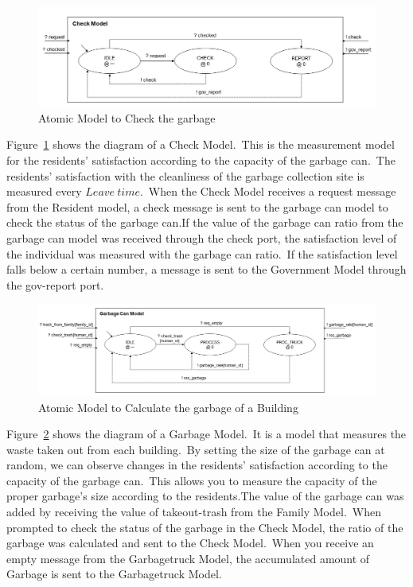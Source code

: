 \documentclass{scsSimAUDPaperFormat}
\begin{document}
\begin{figure}[!ht]
    \centering
    \includegraphics[width=1.0\columnwidth]{fig/check_model.jpg}
    \caption{Atomic Model to Check the garbage}
    \label{Fig:Checkmodel}
\end{figure}
Figure~\ref{Fig:Checkmodel} shows the diagram of a Check Model.~This is the measurement model for the residents' satisfaction according to the capacity of the garbage can.~The residents' satisfaction with the cleanliness of the garbage collection site is measured every $Leave\ time$.~When the Check Model receives a request message from the Resident model, a check message is sent to the garbage can model to check the status of the garbage can.If the value of the garbage can ratio from the garbage can model was received through the check port, the satisfaction level of the individual was measured with the garbage can ratio.~If the satisfaction level falls below a certain number, a message is sent to the Government Model through the gov-report port.
\begin{figure}[!ht]
    \centering
    \includegraphics[width=1.0\columnwidth]{fig/garbagecan_model.jpg}
    \caption{Atomic Model to Calculate the garbage of a Building}
    \label{Fig:Garbagemodel}
\end{figure}
Figure~\ref{Fig:Garbagemodel} shows the diagram of a Garbage Model.~It is a model that measures the waste taken out from each building.~By setting the size of the garbage can at random, we can observe changes in the residents' satisfaction according to the capacity of the garbage can.~This allows you to measure the capacity of the proper garbage's size according to the residents.The value of the garbage can was added by receiving the value of takeout-trash from the Family Model.~When prompted to check the status of the garbage in the Check Model, the ratio of the garbage was calculated and sent to the Check Model.~When you receive an empty message from the Garbagetruck Model, the accumulated amount of Garbage is sent to the Garbagetruck Model.
\end{document}
